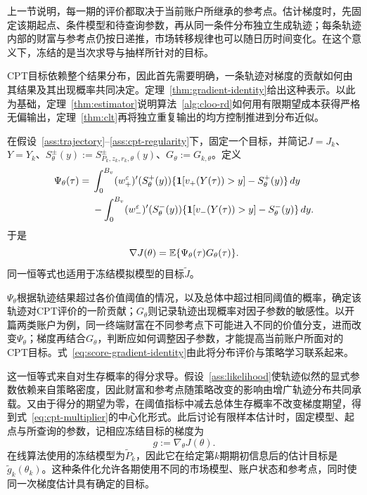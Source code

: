 上一节说明，每一期的评价都取决于当前账户所继承的参考点。估计梯度时，先固定该期起点、条件模型和待查询参数，再从同一条件分布独立生成轨迹；每条轨迹内部的财富与参考点仍按日递推，市场转移规律也可以随日历时间变化。在这个意义下，冻结的是当次求导与抽样所针对的目标。

CPT目标依赖整个结果分布，因此首先需要明确，一条轨迹对梯度的贡献如何由其结果及其出现概率共同决定。定理~\ref{thm:gradient-identity}给出这种表示。以此为基础，定理~\ref{thm:estimator}说明算法~\ref{alg:cloo-rd}如何用有限期望成本获得严格无偏输出，定理~\ref{thm:clt}再将独立重复输出的均方控制推进到分布近似。

\begin{theorem}[正则化CPT得分梯度恒等式]\label{thm:gradient-identity}
在假设~\ref{ass:trajectory}--\ref{ass:cpt-regularity}下，固定一个目标，并简记$J=J_k$、$Y=Y_k$、$S_\theta^\pm(y):=S_{P_k,z_k,r_k,\theta}^\pm(y)$、$G_\theta:=G_{k,\theta}$。定义
\begin{align}\label{eq:cpt-multiplier}
 \Psi_\theta(\tau)
 ={}&\int_0^{B_v}(w_+^\varepsilon)'(S_\theta^+(y))
 \{\mathbf 1[v_+(Y(\tau))>y]-S_\theta^+(y)\}\,dy\notag\\
 &-\int_0^{B_v}(w_-^\varepsilon)'(S_\theta^-(y))
 \{\mathbf 1[v_-(Y(\tau))>y]-S_\theta^-(y)\}\,dy.
\end{align}
于是
\begin{equation}\label{eq:score-gradient-identity}
 \nabla J(\theta)=\mathbb E\{\Psi_\theta(\tau)G_\theta(\tau)\}.
\end{equation}
同一恒等式也适用于冻结模拟模型的目标$\widetilde J$。
\end{theorem}

$\Psi_\theta$根据轨迹结果超过各价值阈值的情况，以及总体中超过相同阈值的概率，确定该轨迹对CPT评价的一阶贡献；$G_\theta$则记录轨迹出现概率对因子参数的敏感性。以开篇两类账户为例，同一终端财富在不同参考点下可能进入不同的价值分支，进而改变$\Psi_\theta$；梯度再结合$G_\theta$，判断应如何调整因子参数，才能提高当前账户所面对的CPT目标。式~\eqref{eq:score-gradient-identity}由此将分布评价与策略学习联系起来。

这一恒等式来自对生存概率的得分求导。假设~\ref{ass:likelihood}使轨迹似然的显式参数依赖来自策略密度，因此财富和参考点随策略改变的影响由增广轨迹分布共同承载。又由于得分的期望为零，在阈值指标中减去总体生存概率不改变梯度期望，得到式~\eqref{eq:cpt-multiplier}的中心化形式。此后讨论有限样本估计时，固定模型、起点与所查询的参数，记相应冻结目标的梯度为
\[
 g:=\nabla_\theta J(\theta).
\]
在线算法使用的冻结模型为$\widetilde P_k$，因此它在给定第$k$期期初信息后的估计目标是$\widetilde g_k(\theta_k)$。这种条件化允许各期使用不同的市场模型、账户状态和参考点，同时使同一次梯度估计具有确定的目标。

